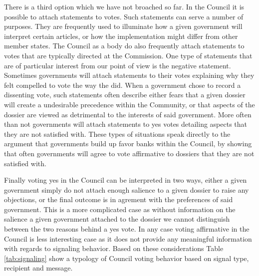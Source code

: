 There is a third option which we have not broached so far. In the Council it is possible to attach statements to votes. Such statements can serve a number of purposes. They are frequently used to illuminate how a given government will interpret certain articles, or how the implementation might differ from other member states. The Council as a body do also frequently attach statements to votes that are typically directed at the Commission. One type of statements that are of particular interest from our point of view is the negative statement. Sometimes governments will attach statements to their votes explaining why they felt compelled to vote the way the did. When a government chose to record a dissenting vote, such statements often describe either fears that a given dossier will create a undesirable precedence within the Community, or that aspects of the dossier are viewed as detrimental to the interests of said government. More often than not governments will attach statements to yes votes detailing aspects that they are not satisfied with. These types of situations speak directly to the argument that governments build up favor banks within the Council, by showing that often governments will agree to vote affirmative to dossiers that they are not satisfied with. 

Finally voting yes in the Council can be interpreted in two ways, either a given government simply do not attach enough salience to a given dossier to raise any objections, or the final outcome is in agrement with the preferences of said government. This is a more complicated case as without information on the salience a given government attached to the dossier we cannot distinguish between the two reasons behind a yes vote. In any case voting affirmative in the Council is less interesting case as it does not provide any meaningful information with regards to signaling behavior. Based on these considerations Table \ref{tab:signaling} show a typology of Council voting behavior based on signal type, recipient and message.

\begin{table}[htp]
  \centering
  \caption{Types of Signaling in the Council}
  \label{tab:signaling}
\end{table}

